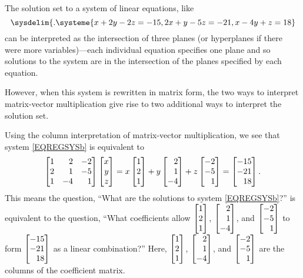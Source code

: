 
The solution set to a system of linear equations, like
\begin{equation}
	\label{EQREGSYSb}
	\sysdelim\{.
		\systeme{
			x+2y-2z=-15,
			2x+y-5z=-21,
			x-4y+z=18
		}
\end{equation}
can be interpreted as the intersection of three planes (or hyperplanes if there were more variables)---each individual equation
specifies one plane and so solutions to the system are in the intersection of the planes specified by each equation.

However, when this system is rewritten in matrix form, the two ways to interpret matrix-vector
multiplication give rise to two additional ways to interpret the solution set.


Using the column interpretation of matrix-vector multiplication, we see that system \eqref{EQREGSYSb} is equivalent to
\[
	\mat{1&2&-2\\2&1&-5\\1&-4&1}\mat{x\\y\\z}=
	     x\mat{1\\2\\1}+y\mat{2\\1\\-4}+z\mat{-2\\-5\\1}
	     =\mat{-15\\-21\\18}.
\]
This means the question, ``What are the solutions to system \eqref{EQREGSYSb}?'' is equivalent to the question, ``What coefficients
allow $\mat{1\\2\\1}$, $\mat{2\\1\\-4}$, and $\mat{-2\\-5\\1}$ to form $\mat{-15\\-21\\18}$ as a linear combination?'' Here,
 $\mat{1\\2\\1}$, $\mat{2\\1\\-4}$, and $\mat{-2\\-5\\1}$ are the columns of the coefficient matrix.


